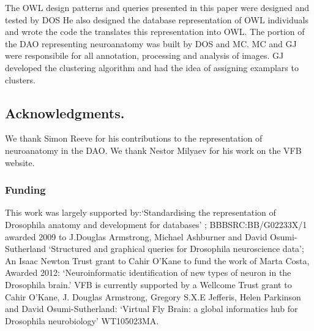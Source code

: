 \documentclass[runningheads,a4paper]{llncs}
\begin{document}
The OWL design patterns and queries presented in this paper were designed and
tested by DOS  He also designed the database representation of OWL
individuals and wrote the code the translates this representation into
OWL.  The portion of the DAO representing neuroanatomy was built by
DOS and MC.  MC and GJ were responsibile for all annotation,
processing and analysis of images. GJ developed the clustering
algorithm and had the idea of assigning examplars to clusters.

\subsection*{Acknowledgments.} 

We thank Simon Reeve for his contributions to the representation of
neuroanatomy in the DAO.  We thank Nestor Milyaev for his work on the
VFB website.

\subsubsection*{Funding}

This work was largely supported by:`Standardising the representation of
Drosophila anatomy and development for databases' ;
BBBSRC:BB/G02233X/1 awarded 2009 to J.Douglas Armstrong, Michael
Ashburner and David Osumi-Sutherland `Structured and graphical queries
for Drosophila neuroscience data'; An Isaac Newton Trust grant to
Cahir O'Kane to fund the work of Marta Costa, Awarded 2012:
`Neuroinformatic identification of new types of neuron in the
Drosophila brain.' VFB is currently supported by a Wellcome Trust
grant to Cahir O'Kane, J. Douglas Armstrong, Gregory S.X.E Jefferis,
Helen Parkinson and David Osumi-Sutherland: `Virtual Fly Brain: a
global informatics hub for Drosophila neurobiology' WT105023MA.






\end{document}
